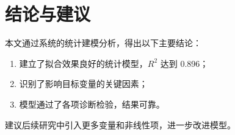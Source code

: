 \section{结论与建议}

本文通过系统的统计建模分析，得出以下主要结论：

\begin{enumerate}
  \item 建立了拟合效果良好的统计模型，$R^2$ 达到 0.896；
  \item 识别了影响目标变量的关键因素；
  \item 模型通过了各项诊断检验，结果可靠。
\end{enumerate}

建议后续研究中引入更多变量和非线性项，进一步改进模型。
